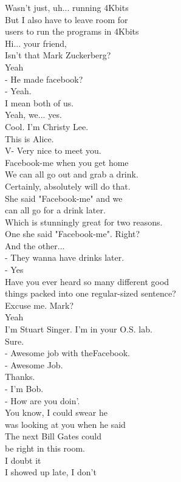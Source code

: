 \documentclass{article}
\begin{document}
\begin{multicols}{3}
Wasn't just, uh... running 4Kbits\\
But I also have to leave room for\\
users to run the programs in 4Kbits\\
Hi... your friend,\\
Isn't that Mark Zuckerberg?\\
Yeah\\
- He made facebook?\\
- Yeah.\\
I mean both of us.\\
Yeah, we... yes.\\
Cool. I'm Christy Lee.\\
This is Alice.\\
V- Very nice to meet you.\\
Facebook-me when you get home\\
We can all go out and grab a drink.\\
Certainly, absolutely will do that.\\
She said "Facebook-me" and we\\
can all go for a drink later.\\
Which is stunningly great for two reasons.\\
One she said "Facebook-me". Right?\\
And the other...\\
- They wanna have drinks later.\\
- Yes\\
Have you ever heard so many different good\\
things packed into one regular-sized sentence?\\
Excuse me. Mark?\\
Yeah\\
I'm Stuart Singer. I'm in your O.S. lab.\\
Sure.\\
- Awesome job with theFacebook.\\
- Awesome Job.\\
Thanks.\\
- I'm Bob.\\
- How are you doin'.\\
You know, I could swear he\\
was looking at you when he said\\
The next Bill Gates could\\
be right in this room.\\
I doubt it\\
I showed up late, I don't\\

\end{multicols}
\end{document}
